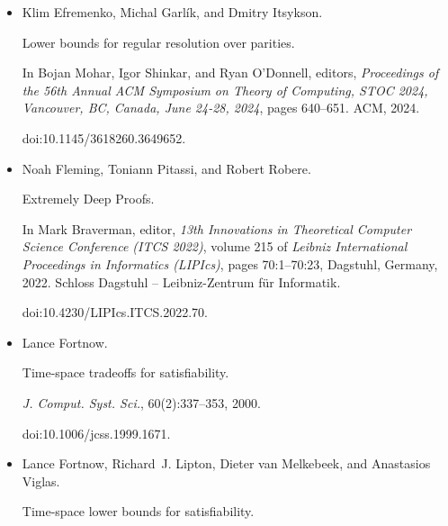 \begin{itemize}
Susanna F. de Rezende, Noah Fleming, Duri Andrea Janett, Jakob Nordström, and
Shuo Pang.


Truly supercritical trade-offs for resolution, cutting planes,
monotone circuits, and weisfeiler-leman, 2024.


doi:10.48550/arXiv.2411.14267.





\item[] 
[13]

Klim Efremenko, Michal Garlík, and Dmitry Itsykson.


Lower bounds for regular resolution over parities.


In Bojan Mohar, Igor Shinkar, and Ryan O’Donnell, editors, \emph{Proceedings of the 56th Annual ACM Symposium on Theory of Computing, STOC
2024, Vancouver, BC, Canada, June 24-28, 2024}, pages 640–651. ACM, 2024.


doi:10.1145/3618260.3649652.





\item[] 
[14]

Noah Fleming, Toniann Pitassi, and Robert Robere.


Extremely Deep Proofs.


In Mark Braverman, editor, \emph{13th Innovations in Theoretical
Computer Science Conference (ITCS 2022)}, volume 215 of \emph{Leibniz
International Proceedings in Informatics (LIPIcs)}, pages 70:1–70:23,
Dagstuhl, Germany, 2022. Schloss Dagstuhl – Leibniz-Zentrum für
Informatik.


doi:10.4230/LIPIcs.ITCS.2022.70.





\item[] 
[15]

Lance Fortnow.


Time-space tradeoffs for satisfiability.


\emph{J. Comput. Syst. Sci.}, 60(2):337–353, 2000.


doi:10.1006/jcss.1999.1671.





\item[] 
[16]

Lance Fortnow, Richard J. Lipton, Dieter van Melkebeek, and Anastasios Viglas.


Time-space lower bounds for satisfiability.



\end{itemize}
